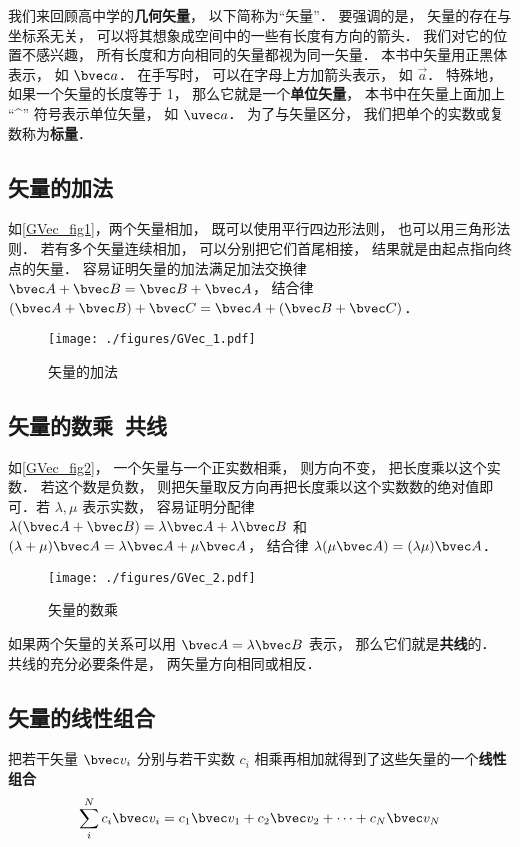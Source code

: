 
我们来回顾高中学的\textbf{几何矢量}， 以下简称为“矢量”． 要强调的是， 矢量的存在与坐标系无关， 可以将其想象成空间中的一些有长度有方向的箭头． 我们对它的位置不感兴趣， 所有长度和方向相同的矢量都视为同一矢量． 本书中矢量用正黑体表示， 如 $\bvec a$． 在手写时， 可以在字母上方加箭头表示， 如 $\overrightarrow{a}$． 特殊地， 如果一个矢量的长度等于 1， 那么它就是一个\textbf{单位矢量}， 本书中在矢量上面加上 “\^{}” 符号表示单位矢量， 如 $\uvec a$． 为了与矢量区分， 我们把单个的实数或复数称为\textbf{标量}．

\subsection{矢量的加法}
如\autoref{GVec_fig1}，两个矢量相加， 既可以使用平行四边形法则， 也可以用三角形法则． 若有多个矢量连续相加， 可以分别把它们首尾相接， 结果就是由起点指向终点的矢量． 容易证明矢量的加法满足加法交换律 $\bvec A + \bvec B = \bvec B + \bvec A$， 结合律 $(\bvec A + \bvec B) + \bvec C = \bvec A + (\bvec B + \bvec C)$．
\begin{figure}[ht]
\centering
\texttt{[image: ./figures/GVec\_1.pdf]}
\caption{矢量的加法} \label{GVec_fig1}
\end{figure}

\subsection{矢量的数乘\ 共线}
如\autoref{GVec_fig2}， 一个矢量与一个正实数相乘， 则方向不变， 把长度乘以这个实数． 若这个数是负数， 则把矢量取反方向再把长度乘以这个实数数的绝对值即可．若 $\lambda, \mu$ 表示实数， 容易证明分配律 $\lambda(\bvec A + \bvec B) = \lambda\bvec A + \lambda\bvec B$ 和 $(\lambda+\mu)\bvec A = \lambda\bvec A + \mu\bvec A$， 结合律 $\lambda(\mu\bvec A) = (\lambda\mu) \bvec A$．
\begin{figure}[ht]
\centering
\texttt{[image: ./figures/GVec\_2.pdf]}
\caption{矢量的数乘} \label{GVec_fig2}
\end{figure}

如果两个矢量的关系可以用 $\bvec A = \lambda\bvec B$ 表示， 那么它们就是\textbf{共线}的． 共线的充分必要条件是， 两矢量方向相同或相反．

\subsection{矢量的线性组合}
把若干矢量 $\bvec v_i$ 分别与若干实数 $c_i$ 相乘再相加就得到了这些矢量的一个\textbf{线性组合}
\begin{equation}\label{GVec_eq1}
\sum_i^N c_i \bvec v_i = c_1\bvec v_1 + c_2\bvec v_2 +\dots +c_N \bvec v_N
\end{equation}

